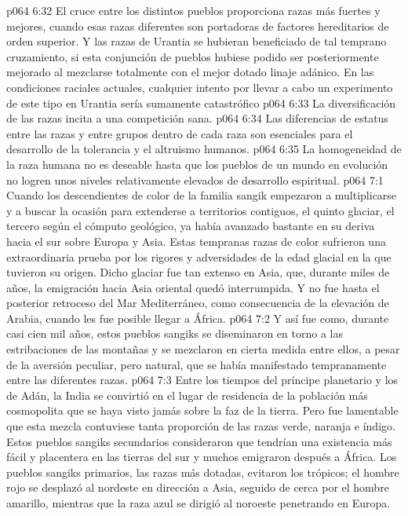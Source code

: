 \vs p064 6:32 El cruce entre los distintos pueblos proporciona razas más fuertes y mejores, cuando esas razas diferentes son portadoras de factores hereditarios de orden superior. Y las razas de Urantia se hubieran beneficiado de tal temprano cruzamiento, si esta conjunción de pueblos hubiese podido ser posteriormente mejorado al mezclarse totalmente con el mejor dotado linaje adánico. En las condiciones raciales actuales, cualquier intento por llevar a cabo un experimento de este tipo en Urantia sería sumamente catastrófico
\vs p064 6:33 La diversificación de las razas incita a una competición sana.
\vs p064 6:34 Las diferencias de estatus entre las razas y entre grupos dentro de cada raza son esenciales para el desarrollo de la tolerancia y el altruismo humanos.
\vs p064 6:35 La homogeneidad de la raza humana no es deseable hasta que los pueblos de un mundo en evolución no logren unos niveles relativamente elevados de desarrollo espiritual.
\vs p064 7:1 Cuando los descendientes de color de la familia sangik empezaron a multiplicarse y a buscar la ocasión para extenderse a territorios contiguos, el quinto glaciar, el tercero según el cómputo geológico, ya había avanzado bastante en su deriva hacia el sur sobre Europa y Asia. Estas tempranas razas de color sufrieron una extraordinaria prueba por los rigores y adversidades de la edad glacial en la que tuvieron su origen. Dicho glaciar fue tan extenso en Asia, que, durante miles de años, la emigración hacia Asia oriental quedó interrumpida. Y no fue hasta el posterior retroceso del Mar Mediterráneo, como consecuencia de la elevación de Arabia, cuando les fue posible llegar a África.
\vs p064 7:2 Y así fue como, durante casi cien mil años, estos pueblos sangiks se diseminaron en torno a las estribaciones de las montañas y se mezclaron en cierta medida entre ellos, a pesar de la aversión peculiar, pero natural, que se había manifestado tempranamente entre las diferentes razas.
\vs p064 7:3 Entre los tiempos del príncipe planetario y los de Adán, la India se convirtió en el lugar de residencia de la población más cosmopolita que se haya visto jamás sobre la faz de la tierra. Pero fue lamentable que esta mezcla contuviese tanta proporción de las razas verde, naranja e índigo. Estos pueblos sangiks secundarios consideraron que tendrían una existencia más fácil y placentera en las tierras del sur y muchos emigraron después a África. Los pueblos sangiks primarios, las razas más dotadas, evitaron los trópicos; el hombre rojo se desplazó al nordeste en dirección a Asia, seguido de cerca por el hombre amarillo, mientras que la raza azul se dirigió al noroeste penetrando en Europa.
